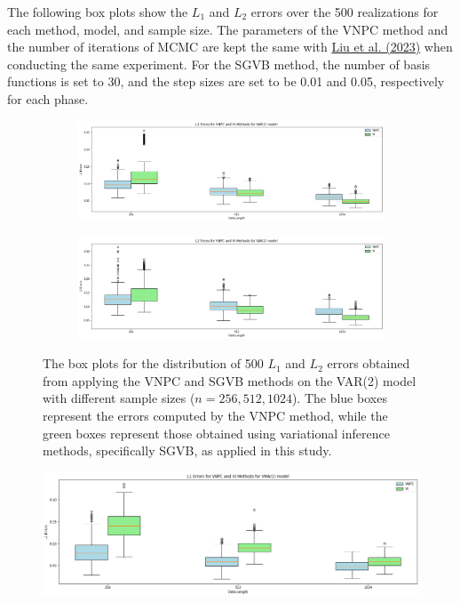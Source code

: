 \documentclass[12pt,a4paper]{article}
\begin{document}
The following box plots show the $L_1$ and $L_2$ errors over the 500 realizations for each method, model, and sample size. The parameters of the VNPC method and the number of iterations of MCMC are kept the same with \hyperref[liu 2023]{Liu et al. (2023)} when conducting the same experiment. For the SGVB method, the number of basis functions is set to 30, and the step sizes are set to be 0.01 and 0.05, respectively for each phase.
\begin{figure}[H]
\centering
\begin{subfigure}{\textwidth} %
  \centering
  \includegraphics[width=18cm]{L1 Errors for VNPC and VI Methods for VAR(2) model.png}
\end{subfigure}

\begin{subfigure}{\textwidth} %
  \centering
  \includegraphics[width=18cm]{L2 Errors for VNPC and VI Methods for VAR(2) model.png}
\end{subfigure}

\caption{The box plots for the distribution of 500 $L_1$ and $L_2$ errors obtained from applying the VNPC and SGVB methods on the VAR(2) model with different sample sizes ($n = 256, 512, 1024$). The blue boxes represent the errors computed by the VNPC method, while the green boxes represent those obtained using variational inference methods, specifically SGVB, as applied in this study.}
\label{l1l2 var2}
\end{figure}

\begin{figure}[H]
\centering
\includegraphics[width=18cm]{L1 Errors for VNPC and VI Methods for VMA(1) model.png}
\end{figure}
\end{document}
